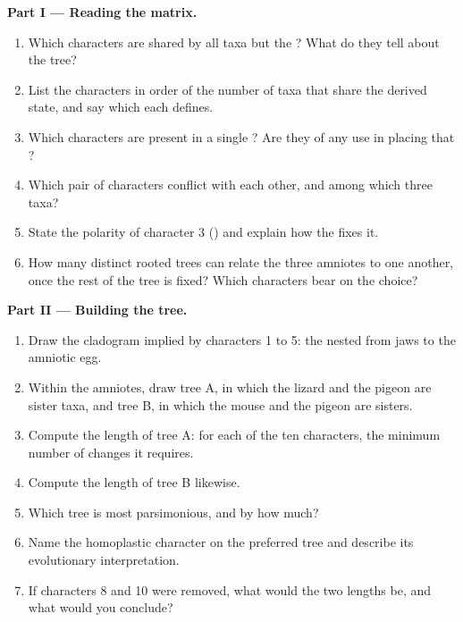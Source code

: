 \begin{problem}
\medskip
\noindent\textbf{Part I --- Reading the matrix.}
\begin{enumerate}
  \item Which characters are shared by all taxa but the ?
        What do they tell about the tree?
  \item List the characters in order of the number of taxa that share
        the derived state, and say which  each defines.
  \item Which characters are present in a single ? Are they of
        any use in placing that ?
  \item Which pair of characters conflict with each other, and among
        which three taxa?
  \item State the polarity of character 3 () and explain how the
         fixes it.
  \item How many distinct rooted trees can relate the three amniotes
        to one another, once the rest of the tree is fixed? Which
        characters bear on the choice?
\end{enumerate}

\medskip
\noindent\textbf{Part II --- Building the tree.}
\begin{enumerate}[resume]
  \item Draw the cladogram implied by characters 1 to 5: the nested
         from jaws to the amniotic egg.
  \item Within the amniotes, draw tree A, in which the lizard and the
        pigeon are sister taxa, and tree B, in which the mouse and the
        pigeon are sisters.
  \item Compute the length of tree A: for each of the ten characters,
        the minimum number of changes it requires.
  \item Compute the length of tree B likewise.
  \item Which tree is most parsimonious, and by how much?
  \item Name the homoplastic character on the preferred tree and
        describe its evolutionary interpretation.
  \item If characters 8 and 10 were removed, what would the two
        lengths be, and what would you conclude?
\end{enumerate}


\end{problem}

